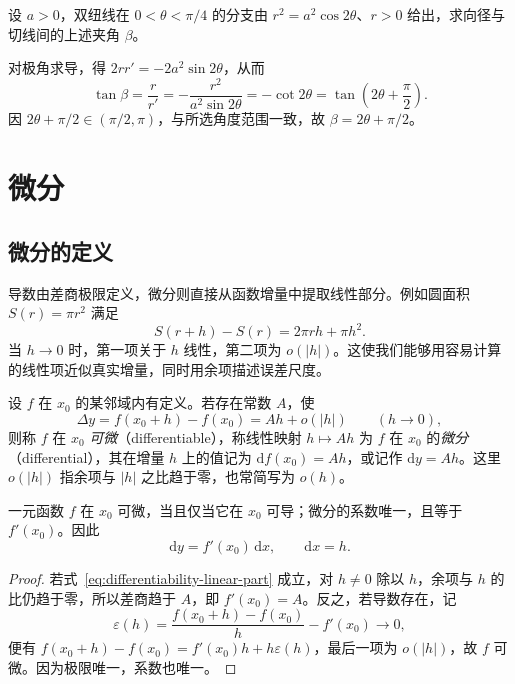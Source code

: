 \documentclass[UTF8,12pt,a4paper,fontset=fandol]{ctexbook}
\begin{document}
\begin{example}
\label{ex:lemniscate-radius-tangent-angle}
设 $a>0$，双纽线在 $0<\theta<\pi/4$ 的分支由 $r^2=a^2\cos2\theta$、$r>0$ 给出，求向径与切线间的上述夹角 $\beta$。
\end{example}
\begin{solve}
对极角求导，得 $2rr'=-2a^2\sin2\theta$，从而
\[
    \tan\beta=\frac r{r'}
    =-\frac{r^2}{a^2\sin2\theta}
    =-\cot2\theta
    =\tan\left(2\theta+\frac\pi2\right).
\]
因 $2\theta+\pi/2\in(\pi/2,\pi)$，与所选角度范围一致，故 $\beta=2\theta+\pi/2$。
\end{solve}

\section{微分}
\label{sec:differentials}

\subsection{微分的定义}
\label{subsec:definition-of-differentials}

导数由差商极限定义，微分则直接从函数增量中提取线性部分。例如圆面积 $S(r)=\pi r^2$ 满足
\[
    S(r+h)-S(r)=2\pi rh+\pi h^2.
\]
当 $h\to0$ 时，第一项关于 $h$ 线性，第二项为 $o(|h|)$。这使我们能够用容易计算的线性项近似真实增量，同时用余项描述误差尺度。

\begin{definition}
\label{def:one-variable-differential}
设 $f$ 在 $x_0$ 的某邻域内有定义。若存在常数 $A$，使
\begin{equation}
\label{eq:differentiability-linear-part}
    \Delta y=f(x_0+h)-f(x_0)=Ah+o(|h|)\qquad(h\to0),
\end{equation}
则称 $f$ 在 $x_0$ \emph{可微}（differentiable），称线性映射 $h\mapsto Ah$ 为 $f$ 在 $x_0$ 的\emph{微分}（differential），其在增量 $h$ 上的值记为 $\mathrm df(x_0)=Ah$，或记作 $\mathrm dy=Ah$。这里 $o(|h|)$ 指余项与 $|h|$ 之比趋于零，也常简写为 $o(h)$。
\end{definition}

\begin{theorem}
\label{thm:one-variable-differentiable-iff-derivable}
一元函数 $f$ 在 $x_0$ 可微，当且仅当它在 $x_0$ 可导；微分的系数唯一，且等于 $f'(x_0)$。因此
\begin{equation}
\label{eq:one-variable-differential}
    \mathrm dy=f'(x_0)\,\mathrm dx,\qquad \mathrm dx=h.
\end{equation}
\end{theorem}
\begin{proof}
若式~\eqref{eq:differentiability-linear-part} 成立，对 $h\ne0$ 除以 $h$，余项与 $h$ 的比仍趋于零，所以差商趋于 $A$，即 $f'(x_0)=A$。反之，若导数存在，记
\[
    \varepsilon(h)=\frac{f(x_0+h)-f(x_0)}h-f'(x_0)\longrightarrow0,
\]
便有 $f(x_0+h)-f(x_0)=f'(x_0)h+h\varepsilon(h)$，最后一项为 $o(|h|)$，故 $f$ 可微。因为极限唯一，系数也唯一。
\end{proof}
\end{document}
